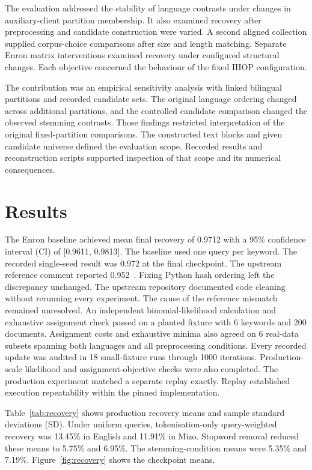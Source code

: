 \documentclass[pdflatex,sn-mathphys-num]{sn-jnl}%
\theoremstyle{thmstyleone}%
\theoremstyle{thmstyletwo}%
\theoremstyle{thmstylethree}%
\newcommand{\RealCheckCases}{6}
\newcommand{\IterativeCases}{18}
\newcommand{\IterativeSteps}{1000}
\newcommand{\IndependentKeywords}{6}
\newcommand{\IndependentDocuments}{200}
\newcommand{\ConfidencePercent}{95}
\newcommand{\EnronMean}{0.9712}
\newcommand{\EnronLow}{0.9611}
\newcommand{\EnronHigh}{0.9813}
\newcommand{\SmokeObserved}{0.972}
\newcommand{\SmokeExpected}{0.952}
\newcommand{\ENTokenUniformPercent}{13.45}
\newcommand{\ENStopUniformPercent}{5.75}
\newcommand{\ENStemUniformPercent}{5.35}
\newcommand{\LUSTokenUniformPercent}{11.91}
\newcommand{\LUSStopUniformPercent}{6.95}
\newcommand{\LUSStemUniformPercent}{7.19}
\begin{document}
The evaluation addressed the stability of language contrasts under changes in auxiliary-client partition membership. It also examined recovery after preprocessing and candidate construction were varied. A second aligned collection supplied corpus-choice comparisons after size and length matching. Separate Enron matrix interventions examined recovery under configured structural changes. Each objective concerned the behaviour of the fixed IHOP configuration.

The contribution was an empirical sensitivity analysis with linked bilingual partitions and recorded candidate sets. The original language ordering changed across additional partitions, and the controlled candidate comparison changed the observed stemming contrasts. Those findings restricted interpretation of the original fixed-partition comparisons. The constructed text blocks and given candidate universe defined the evaluation scope. Recorded results and reconstruction scripts supported inspection of that scope and its numerical consequences.

\section{Results}
The Enron baseline achieved mean final recovery of \EnronMean{} with a \ConfidencePercent{}\% confidence interval (CI) of [\EnronLow{}, \EnronHigh{}]. The baseline used one query per keyword. The recorded single-seed result was \SmokeObserved{} at the final checkpoint. The upstream reference comment reported \SmokeExpected{}~\cite{ihopcode}. Fixing Python hash ordering left the discrepancy unchanged. The upstream repository documented code cleaning without rerunning every experiment. The cause of the reference mismatch remained unresolved. An independent binomial-likelihood calculation and exhaustive assignment check passed on a planted fixture with \IndependentKeywords{} keywords and \IndependentDocuments{} documents. Assignment costs and exhaustive minima also agreed on \RealCheckCases{} real-data subsets spanning both languages and all preprocessing conditions. Every recorded update was audited in \IterativeCases{} small-fixture runs through \IterativeSteps{} iterations. Production-scale likelihood and assignment-objective checks were also completed. The production experiment matched a separate replay exactly. Replay established execution repeatability within the pinned implementation.

Table~\ref{tab:recovery} shows production recovery means and sample standard deviations (SD). Under uniform queries, tokenisation-only query-weighted recovery was \ENTokenUniformPercent{}\% in English and \LUSTokenUniformPercent{}\% in Mizo. Stopword removal reduced these means to \ENStopUniformPercent{}\% and \LUSStopUniformPercent{}\%. The stemming-condition means were \ENStemUniformPercent{}\% and \LUSStemUniformPercent{}\%. Figure~\ref{fig:recovery} shows the checkpoint means.
\end{document}
